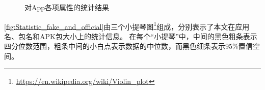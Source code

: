 \begin{figure}[htbp]
	\centering
    \hfill
    \hfill
    \hfill
	\caption{对App各项属性的统计结果}
	\label{fig:Statistic_fake_and_official}
	\vspace{-5mm}
\end{figure}

\autoref{fig:Statistic_fake_and_official}由三个小提琴图\footnote{\url{https://en.wikipedia.org/wiki/Violin_plot}}组成，分别表示了本文在应用名、包名和APK包大小上的统计信息。
在每个``小提琴''中，中间的黑色粗条表示四分位数范围，粗条中间的小白点表示数据的中位数，而黑色细条表示95\%置信空间。

